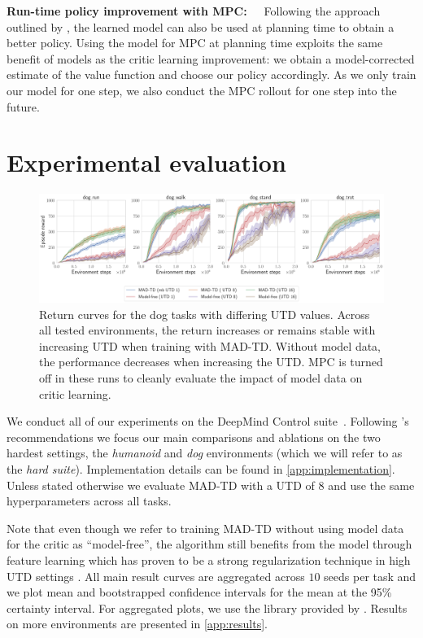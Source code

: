 \textbf{Run-time policy improvement with MPC:}~~~Following the approach outlined by  \textcite{hansen2022temporal}, the learned model can also be used at planning time to obtain a better policy.
Using the model for MPC at planning time exploits the same benefit of models as the critic learning improvement: we obtain a model-corrected estimate of the value function and choose our policy accordingly.
As we only train our model for one step, we also conduct the MPC rollout for one step into the future.


\section{Experimental evaluation}

\begin{figure}[t]
    \centering
    \includegraphics[width=1.0\linewidth]{figures/mad-td/dog_utd_comp.pdf}
    \caption{Return curves for the dog tasks with differing UTD values. Across all tested environments, the return increases or remains stable with increasing UTD when training with MAD-TD. Without model data, the performance decreases when increasing the UTD. MPC is turned off in these runs to cleanly evaluate the impact of model data on critic learning.}
    \label{fig:mad:main_dog}
\end{figure}


We conduct all of our experiments on the DeepMind Control suite~\parencite{tunyasuvunakool2020dmcontrol}. Following \textcite{nauman2024bigger}'s recommendations we focus our main comparisons and ablations on the two hardest settings, the \emph{humanoid} and \emph{dog} environments (which we will refer to as the \emph{hard suite}).
Implementation details can be found in \autoref{app:implementation}.
Unless stated otherwise we evaluate MAD-TD with a UTD of 8 and use the same hyperparameters across all tasks.

Note that even though we refer to training MAD-TD without using model data for the critic as ``model-free'', the algorithm still benefits from the model through feature learning which has proven to be a strong regularization technique in high UTD settings \parencite{schwarzer2023bigger}.
All main result curves are aggregated across $10$ seeds per task and we plot mean and bootstrapped confidence intervals for the mean at the 95\% certainty interval.
For aggregated plots, we use the library provided by \textcite{agarwal2021deep}.
Results on more environments are presented in \autoref{app:results}.

